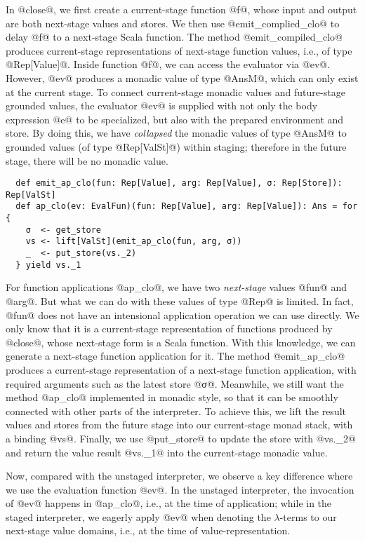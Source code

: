 In @close@, we first create a current-stage function @f@, whose input and
output are both next-stage values and stores.  We then use @emit_complied_clo@
to delay @f@ to a next-stage Scala function.
The method @emit_compiled_clo@ produces current-stage representations of
next-stage function values, i.e., of type @Rep[Value]@.
Inside function @f@, we can access the evaluator via @ev@.
However, @ev@ produces a monadic value of type @AnsM@, which can only exist at
the current stage. To connect current-stage monadic values and future-stage
grounded values, the evaluator @ev@ is supplied with not only the body
expression @e@ to be specialized, but also with the prepared environment and
store.  By doing this, we have \textit{collapsed} the monadic values of type
@AnsM@ to grounded values (of type @Rep[ValSt]@) within staging; therefore in
the future stage, there will be no monadic value.
\begin{lstlisting}
  def emit_ap_clo(fun: Rep[Value], arg: Rep[Value], σ: Rep[Store]): Rep[ValSt]
  def ap_clo(ev: EvalFun)(fun: Rep[Value], arg: Rep[Value]): Ans = for {
    σ  <- get_store
    vs <- lift[ValSt](emit_ap_clo(fun, arg, σ))
    _  <- put_store(vs._2)
  } yield vs._1
\end{lstlisting}

For function applications @ap_clo@, we have two \textit{next-stage} values @fun@
and @arg@. But what we can do with these values of type @Rep@ is limited. 
In fact, @fun@ does not have an intensional application operation we can use
directly. We only know that it is a current-stage representation of functions produced by @close@,
whose next-stage form is a Scala function.
With this knowledge, we can generate a next-stage function application for it. 
The method @emit_ap_clo@ produces a current-stage
representation of a next-stage function application, with required arguments
such as the latest store @σ@. Meanwhile, we still want the method @ap_clo@
implemented in monadic style, so that it can be smoothly connected with other
parts of the interpreter.  To achieve this, we lift the result values and
stores from the future stage into our current-stage monad stack, with a binding
@vs@.  Finally, we use @put_store@ to update the store with @vs._2@ and return
the value result @vs._1@ into the current-stage monadic value.

Now, compared with the unstaged interpreter, we observe a key difference where
we use the evaluation function @ev@.  In the unstaged interpreter, the
invocation of @ev@ happens in @ap_clo@, i.e., at the time of application; while in
the staged interpreter, we eagerly apply @ev@ when denoting the $\lambda$-terms to
our next-stage value domains, i.e., at the time of value-representation.

